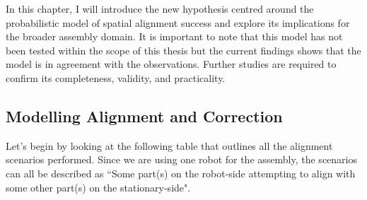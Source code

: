 \documentclass[11pt]{book}
\begin{document}
In this chapter, I will introduce the new hypothesis centred around the probabilistic model of spatial alignment success and explore its implications for the broader assembly domain. It is important to note that this model has not been tested within the scope of this thesis but the current findings shows that the model is in agreement with the observations. Further studies are required to confirm its completeness, validity, and practicality. 

\subsection{Modelling Alignment and Correction}

Let's begin by looking at the following table that outlines all the alignment scenarios performed. Since we are using one robot for the assembly, the scenarios can all be described as ``Some part(s) on the robot-side attempting to align with some other part(s) on the stationary-side". 
\end{document}
